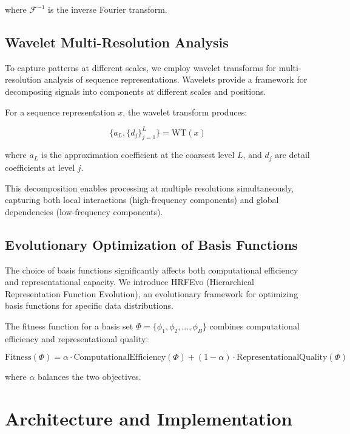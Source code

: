 \documentclass[10pt,twocolumn,letterpaper]{article}
\begin{document}
where $\mathcal{F}^{-1}$ is the inverse Fourier transform.

\subsection{Wavelet Multi-Resolution Analysis}

To capture patterns at different scales, we employ wavelet transforms for multi-resolution analysis of sequence representations. Wavelets provide a framework for decomposing signals into components at different scales and positions.

For a sequence representation $x$, the wavelet transform produces:

\begin{equation}
\{a_L, \{d_j\}_{j=1}^L\} = \text{WT}(x)
\end{equation}

where $a_L$ is the approximation coefficient at the coarsest level $L$, and $d_j$ are detail coefficients at level $j$.

This decomposition enables processing at multiple resolutions simultaneously, capturing both local interactions (high-frequency components) and global dependencies (low-frequency components).

\subsection{Evolutionary Optimization of Basis Functions}

The choice of basis functions significantly affects both computational efficiency and representational capacity. We introduce HRFEvo (Hierarchical Representation Function Evolution), an evolutionary framework for optimizing basis functions for specific data distributions.

The fitness function for a basis set $\Phi = \{\phi_1, \phi_2, ..., \phi_B\}$ combines computational efficiency and representational quality:

\begin{equation}
\text{Fitness}(\Phi) = \alpha \cdot \text{ComputationalEfficiency}(\Phi) + (1-\alpha) \cdot \text{RepresentationalQuality}(\Phi)
\end{equation}

where $\alpha$ balances the two objectives.

\section{Architecture and Implementation}
\end{document}
